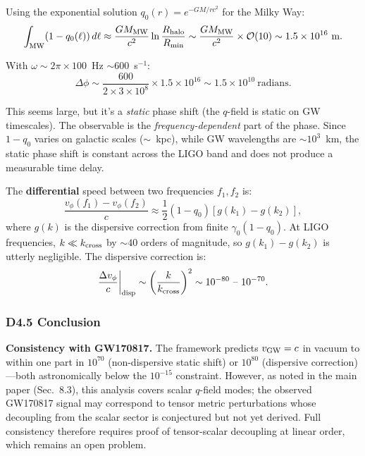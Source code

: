 \documentclass[reprint]{revtex4-2}
\begin{document}
Using the exponential solution $q_0(r)=e^{-GM/rc^2}$ for the Milky Way:
\begin{equation}
\int_{\rm MW} (1-q_0(\ell))\,d\ell \approx \frac{GM_{\rm MW}}{c^2}\ln\frac{R_{\rm halo}}{R_{\rm min}} \sim \frac{GM_{\rm MW}}{c^2}\times \mathcal{O}(10) \sim 1.5\times 10^{16}~\text{m}.
\end{equation}

With $\omega \sim 2\pi\times 100$~Hz $\sim 600$~s$^{-1}$:
\begin{equation}
\Delta\phi \sim \frac{600}{2\times 3\times 10^8}\times 1.5\times 10^{16} \sim 1.5\times 10^{10}~\text{radians}.
\end{equation}

This seems large, but it's a \emph{static} phase shift (the $q$-field is static on GW timescales). The observable is the \emph{frequency-dependent} part of the phase. Since $1-q_0$ varies on galactic scales ($\sim$~kpc), while GW wavelengths are $\sim 10^3$~km, the static phase shift is constant across the LIGO band and does not produce a measurable time delay.

The \textbf{differential} speed between two frequencies $f_1, f_2$ is:
\begin{equation}
\frac{v_\phi(f_1) - v_\phi(f_2)}{c} \approx \frac{1}{2}(1-q_0)\left[g(k_1) - g(k_2)\right],
\end{equation}
where $g(k)$ is the dispersive correction from finite $\gamma_0(1-q_0)$. At LIGO frequencies, $k \ll k_{\rm cross}$ by $\sim 40$ orders of magnitude, so $g(k_1)-g(k_2)$ is utterly negligible. The dispersive correction is:
\begin{equation}
\frac{\Delta v_\phi}{c}\bigg|_{\rm disp} \sim \left(\frac{k}{k_{\rm cross}}\right)^2 \sim 10^{-80}\ \text{--}\ 10^{-70}.
\end{equation}

\subsubsection{D4.5 Conclusion}

\textbf{Consistency with GW170817.} The framework predicts $v_{\rm GW} = c$ in vacuum to within one part in $10^{70}$ (non-dispersive static shift) or $10^{80}$ (dispersive correction)---both astronomically below the $10^{-15}$ constraint. However, as noted in the main paper (Sec.~8.3), this analysis covers scalar $q$-field modes; the observed GW170817 signal may correspond to tensor metric perturbations whose decoupling from the scalar sector is conjectured but not yet derived. Full consistency therefore requires proof of tensor-scalar decoupling at linear order, which remains an open problem.
\end{document}
